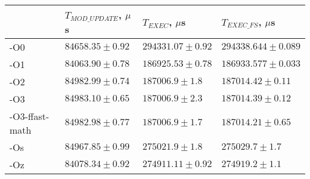 \begin{tabular}{llll}
\toprule
 & $T_{MOD\_UPDATE}$, $\mu$s & $T_{EXEC}$, $\mu$s & $T_{EXEC\_FS}$, $\mu$s \\
\midrule
-O0 & $84658.35 \pm 0.92$ & $294331.07 \pm 0.92$ & $294338.644 \pm 0.089$ \\
-O1 & $84063.90 \pm 0.78$ & $186925.53 \pm 0.78$ & $186933.577 \pm 0.033$ \\
-O2 & $84982.99 \pm 0.74$ & $187006.9 \pm 1.8$ & $187014.42 \pm 0.11$ \\
-O3 & $84983.10 \pm 0.65$ & $187006.9 \pm 2.3$ & $187014.39 \pm 0.12$ \\
-O3-ffast-math & $84982.98 \pm 0.77$ & $187006.9 \pm 1.7$ & $187014.21 \pm 0.65$ \\
-Os & $84967.85 \pm 0.99$ & $275021.9 \pm 1.8$ & $275029.7 \pm 1.7$ \\
-Oz & $84078.34 \pm 0.92$ & $274911.11 \pm 0.92$ & $274919.2 \pm 1.1$ \\
\bottomrule
\end{tabular}
